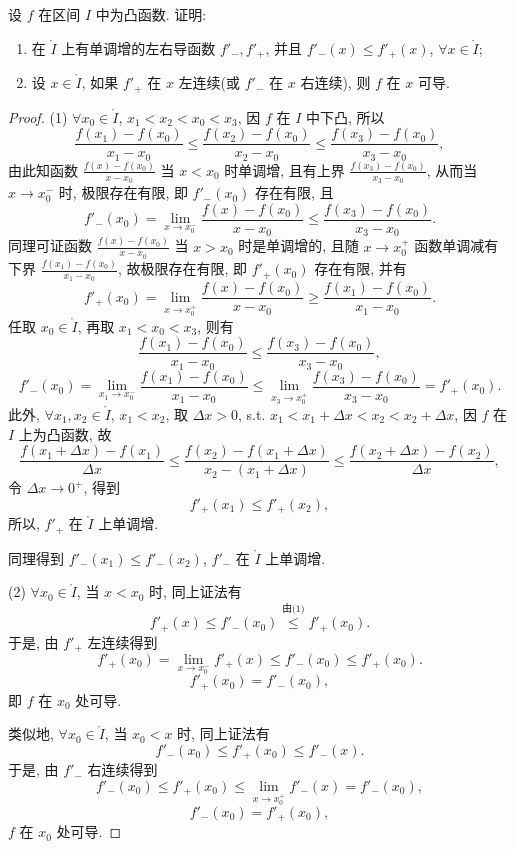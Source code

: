 \begin{example}\label{ex:3.6.6}
设 $f$ 在区间 $I$ 中为凸函数. 证明:
\begin{enumerate}[label=(\arabic*)]
  \item 在 $\mathring{I}$ 上有单调增的左右导函数 $f'_{-},f'_{+}$, 并且 $f'_{-}(x)\leqslant f'_{+}(x)$, $\forall x\in\mathring{I}$;
  \item 设 $x\in\mathring{I}$, 如果 $f'_{+}$ 在 $x$ 左连续(或 $f'_{-}$ 在 $x$ 右连续), 则 $f$ 在 $x$ 可导.
\end{enumerate}
\end{example}

\begin{proof}
(1) $\forall x_{0}\in\mathring{I}$, $x_{1}<x_{2}<x_{0}<x_{3}$, 因 $f$ 在 $I$ 中下凸, 所以
\[
\frac{f(x_{1})-f(x_{0})}{x_{1}-x_{0}}\leqslant\frac{f(x_{2})-f(x_{0})}{x_{2}-x_{0}}\leqslant\frac{f(x_{3})-f(x_{0})}{x_{3}-x_{0}},
\]
由此知函数 $\frac{f(x)-f(x_{0})}{x-x_{0}}$ 当 $x<x_{0}$ 时单调增, 且有上界 $\frac{f(x_{3})-f(x_{0})}{x_{3}-x_{0}}$, 从而当 $x\to x_{0}^{-}$ 时, 极限存在有限, 即 $f'_{-}(x_{0})$ 存在有限, 且
\[
f'_{-}(x_{0})=\lim_{x\to x_{0}^{-}}\frac{f(x)-f(x_{0})}{x-x_{0}}\leqslant\frac{f(x_{3})-f(x_{0})}{x_{3}-x_{0}}.
\]
同理可证函数 $\frac{f(x)-f(x_{0})}{x-x_{0}}$ 当 $x>x_{0}$ 时是单调增的, 且随 $x\to x_{0}^{+}$ 函数单调减有下界 $\frac{f(x_{1})-f(x_{0})}{x_{1}-x_{0}}$, 故极限存在有限, 即 $f'_{+}(x_{0})$ 存在有限, 并有
\[
f'_{+}(x_{0})=\lim_{x\to x_{0}^{+}}\frac{f(x)-f(x_{0})}{x-x_{0}}\geqslant\frac{f(x_{1})-f(x_{0})}{x_{1}-x_{0}}.
\]
任取 $x_{0}\in\mathring{I}$, 再取 $x_{1}<x_{0}<x_{3}$, 则有
\[
\frac{f(x_{1})-f(x_{0})}{x_{1}-x_{0}}\leqslant\frac{f(x_{3})-f(x_{0})}{x_{3}-x_{0}},
\]
\[
f'_{-}(x_{0})=\lim_{x_{1}\to x_{0}^{-}}\frac{f(x_{1})-f(x_{0})}{x_{1}-x_{0}}\leqslant\lim_{x_{3}\to x_{0}^{+}}\frac{f(x_{3})-f(x_{0})}{x_{3}-x_{0}}=f'_{+}(x_{0}).
\]
此外, $\forall x_{1},x_{2}\in\mathring{I}$, $x_{1}<x_{2}$, 取 $\Delta x>0$, s.t. $x_{1}<x_{1}+\Delta x<x_{2}<x_{2}+\Delta x$, 因 $f$ 在 $I$ 上为凸函数, 故
\[
\frac{f(x_{1}+\Delta x)-f(x_{1})}{\Delta x}\leqslant\frac{f(x_{2})-f(x_{1}+\Delta x)}{x_{2}-(x_{1}+\Delta x)}\leqslant\frac{f(x_{2}+\Delta x)-f(x_{2})}{\Delta x},
\]
令 $\Delta x\to 0^{+}$, 得到
\[
f'_{+}(x_{1})\leqslant f'_{+}(x_{2}),
\]
所以, $f'_{+}$ 在 $\mathring{I}$ 上单调增.

同理得到 $f'_{-}(x_{1})\leqslant f'_{-}(x_{2})$, $f'_{-}$ 在 $\mathring{I}$ 上单调增.

(2) $\forall x_{0}\in\mathring{I}$, 当 $x<x_{0}$ 时, 同上证法有
\[
f'_{+}(x)\leqslant f'_{-}(x_{0})\overset{\text{由(1)}}{\leqslant} f'_{+}(x_{0}).
\]
于是, 由 $f'_{+}$ 左连续得到
\[
f'_{+}(x_{0})=\lim_{x\to x_{0}^{-}}f'_{+}(x)\leqslant f'_{-}(x_{0})\leqslant f'_{+}(x_{0}).
\]
\[
f'_{+}(x_{0})=f'_{-}(x_{0}),
\]
即 $f$ 在 $x_{0}$ 处可导.

类似地, $\forall x_{0}\in\mathring{I}$, 当 $x_{0}<x$ 时, 同上证法有
\[
f'_{-}(x_{0})\leqslant f'_{+}(x_{0})\leqslant f'_{-}(x).
\]
于是, 由 $f'_{-}$ 右连续得到
\[
f'_{-}(x_{0})\leqslant f'_{+}(x_{0})\leqslant\lim_{x\to x_{0}^{+}}f'_{-}(x)=f'_{-}(x_{0}),
\]
\[
f'_{-}(x_{0})=f'_{+}(x_{0}),
\]
$f$ 在 $x_{0}$ 处可导.
\end{proof}

